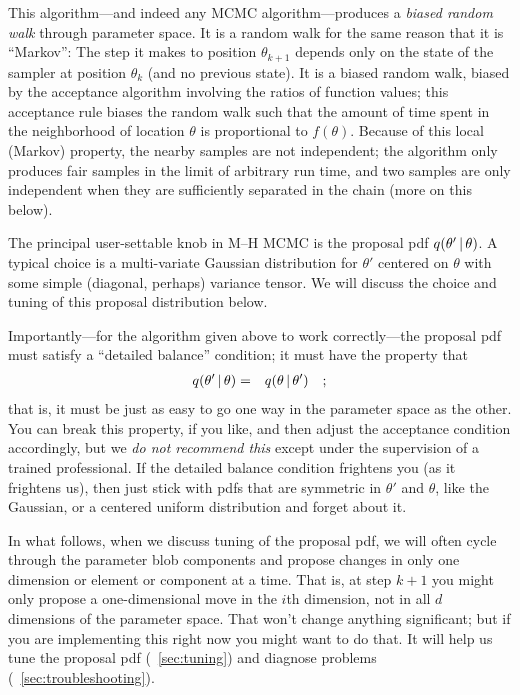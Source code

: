 \documentclass[12pt,twoside,pdftex]{article}
\newcommand{\pars}{\theta}
\begin{document}
This algorithm---and indeed any MCMC algorithm---produces a
  \emph{biased random walk} through parameter space.
It is a random walk for the same reason that it is ``Markov'':
The step it makes to position $\pars_{k+1}$ depends only on the state
  of the sampler at position $\pars_k$ (and no previous state).
It is a biased random walk, biased by the acceptance algorithm
  involving the ratios of function values; this acceptance rule biases
  the random walk such that the amount of time spent in the neighborhood
  of location $\pars$ is proportional to $f(\pars)$.
Because of this local (Markov) property, the nearby samples are not
  independent; the algorithm only produces fair samples in the limit of
  arbitrary run time, and two samples are only independent when they are
  sufficiently separated in the chain (more on this below).

The principal user-settable knob in M--H MCMC is the proposal
  pdf $q(\pars'\given\pars)$.
A typical choice is a multi-variate Gaussian distribution for $\pars'$
  centered on $\pars$ with some simple (diagonal, perhaps) variance
  tensor.
We will discuss the choice and tuning of this proposal distribution
  below.

Importantly---for the algorithm given above to work correctly---the
  proposal pdf must satisfy a ``detailed balance'' condition; it
  must have the property that
\begin{eqnarray}
q(\pars'\given\pars) &=& q(\pars\given\pars')
\quad ;
\end{eqnarray}
that is, it must be just as easy to go one way in the parameter space
  as the other.
You can break this property, if you like, and then adjust the
  acceptance condition accordingly, but we \emph{do not recommend this}
  except under the supervision of a trained professional.
If the detailed balance condition frightens you (as it frightens us),
  then just stick with pdfs that are symmetric in $\pars'$ and $\pars$,
  like the Gaussian, or a centered uniform distribution and forget about
  it.

In what follows, when we discuss tuning of the proposal pdf, we will
  often cycle through the parameter blob components and propose changes
  in only one dimension or element or component at a time.
That is, at step $k+1$ you might only propose a one-dimensional move
  in the $i$th dimension, not in all $d$ dimensions of the parameter
  space.
That won't change anything significant; but if you are implementing
  this right now you might want to do that.
It will help us tune the proposal pdf (\sectionname~\ref{sec:tuning})
and diagnose problems (\sectionname~\ref{sec:troubleshooting}).
\end{document}
